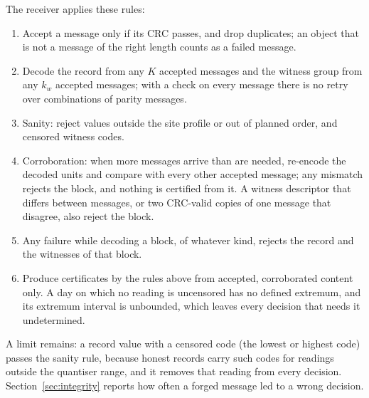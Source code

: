 The receiver applies these rules:
\begin{enumerate}
  \item Accept a message only if its CRC passes, and drop duplicates; an object that is not a message of the right length counts as a failed message.
  \item Decode the record from any $K$ accepted messages and the witness group from any $k_w$ accepted messages; with a check on every message there is no retry over combinations of parity messages.
  \item Sanity: reject values outside the site profile or out of planned order, and censored witness codes.
  \item Corroboration: when more messages arrive than are needed, re-encode the decoded units and compare with every other accepted message; any mismatch rejects the block, and nothing is certified from it. A witness descriptor that differs between messages, or two CRC-valid copies of one message that disagree, also reject the block.
  \item Any failure while decoding a block, of whatever kind, rejects the record and the witnesses of that block.
  \item Produce certificates by the rules above from accepted, corroborated content only. A day on which no reading is uncensored has no defined extremum, and its extremum interval is unbounded, which leaves every decision that needs it undetermined.
\end{enumerate}
A limit remains: a record value with a censored code (the lowest or highest code) passes the sanity rule, because honest records carry such codes for readings outside the quantiser range, and it removes that reading from every decision. Section~\ref{sec:integrity} reports how often a forged message led to a wrong decision.


